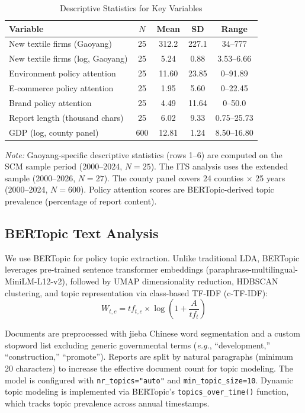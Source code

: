 \documentclass[a4paper, twoside, final]{article}
\begin{document}
\begin{table}[htbp]
\centering
\caption{Descriptive Statistics for Key Variables}
\label{tab:desc}
\begin{tabular}{l c c c c}
\toprule
Variable & $N$ & Mean & SD & Range \\
\midrule
New textile firms (Gaoyang) & 25 & 312.2 & 227.1 & 34--777 \\
New textile firms (log, Gaoyang) & 25 & 5.24 & 0.88 & 3.53--6.66 \\
Environment policy attention & 25 & 11.60 & 23.85 & 0--91.89 \\
E-commerce policy attention & 25 & 1.95 & 5.60 & 0--22.45 \\
Brand policy attention & 25 & 4.49 & 11.64 & 0--50.0 \\
Report length (thousand chars) & 25 & 6.02 & 9.33 & 0.75--25.73 \\
GDP (log, county panel) & 600 & 12.81 & 1.24 & 8.50--16.80 \\
\bottomrule
\end{tabular}

\vspace{4pt}
{\footnotesize\textit{Note:} Gaoyang-specific descriptive statistics (rows 1--6) are computed on the SCM sample period (2000--2024, $N=25$). The ITS analysis uses the extended sample (2000--2026, $N=27$). The county panel covers 24 counties $\times$ 25 years (2000--2024, $N=600$). Policy attention scores are BERTopic-derived topic prevalence (percentage of report content).}
\end{table}

\subsection{BERTopic Text Analysis}
We use BERTopic \citep{Grootendorst2022} for policy topic extraction. Unlike traditional LDA, BERTopic leverages pre-trained sentence transformer embeddings (paraphrase-multilingual-MiniLM-L12-v2), followed by UMAP dimensionality reduction, HDBSCAN clustering, and topic representation via class-based TF-IDF (c-TF-IDF):
\begin{equation}
    W_{t,c} = tf_{t,c} \times \log\left(1 + \frac{A}{tf_t}\right)
\end{equation}

Documents are preprocessed with jieba Chinese word segmentation and a custom stopword list excluding generic governmental terms (\textit{e.g.}, ``development,'' ``construction,'' ``promote''). Reports are split by natural paragraphs (minimum 20 characters) to increase the effective document count for topic modeling. The model is configured with \texttt{nr\_topics="auto"} and \texttt{min\_topic\_size=10}. Dynamic topic modeling is implemented via BERTopic's \texttt{topics\_over\_time()} function, which tracks topic prevalence across annual timestamps.
\end{document}
